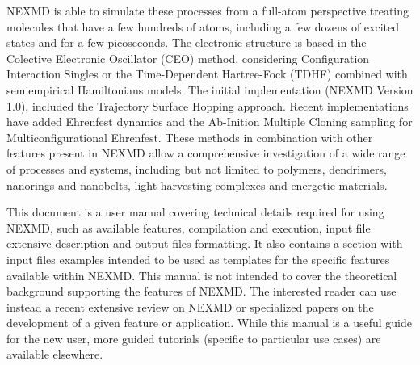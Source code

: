 NEXMD is able to simulate these processes from a full-atom perspective treating molecules that have a few hundreds of atoms, including a few dozens of excited states and for a few picoseconds. The electronic structure is based in the Colective Electronic Oscillator (CEO) method\cite{tretiak2002density}, considering Configuration Interaction Singles\cite{thouless2014quantum} or the Time-Dependent Hartree-Fock (TDHF)\cite{jorgensen1975molecular,mclachlan1964time} combined with semiempirical Hamiltonians models. The initial implementation (NEXMD Version 1.0), included the Trajectory Surface Hopping approach\cite{tully1990molecular}. Recent implementations have added Ehrenfest dynamics\cite{fernandez2016non} and the Ab-Inition Multiple Cloning sampling for Multiconfigurational Ehrenfest\cite{freixas2018ab}. These methods in combination with other features present in NEXMD allow a comprehensive investigation of a wide range of processes and systems, including but not limited to polymers\cite{clark2012femtosecond,oldani2014modeling,ondarse2014computational,alfonso2016interference,sifain2018photoexcited,ondarse2018let,mukazhanova2023impact}, dendrimers\cite{freixas2022ultrafast,ondarse2016ultrafast,galindo2015dynamics,fernandez2012shishiodoshi,soler2012analysis,ondarse2018energy,freixas2019photoinduced,bonilla2023impact}, nanorings and nanobelts\cite{franklin2017phonon,oldani2017photoinduced,rodriguez2018modification,franklin2016carbon,freixas2022infinitene,negrin2023photoexcited}, light harvesting complexes\cite{bricker2015non,shenai2015internal,zheng2017photoinduced} and energetic materials\cite{greenfield2015photoactive,nelson2016ultrafast,lystrom2018site}.

This document is a user manual covering technical details required for using NEXMD, such as available features, compilation and execution, input file extensive description and output files formatting. It also contains a section with input files examples intended to be used as templates for the specific features available within NEXMD. This manual is not intended to cover the theoretical background supporting the features of NEXMD. The interested reader can use instead a recent extensive review on NEXMD\cite{nelson2020non} or specialized papers on the development of a given feature or application. While this manual is a useful guide for the new user, more guided tutorials (specific to particular use cases) are available elsewhere.